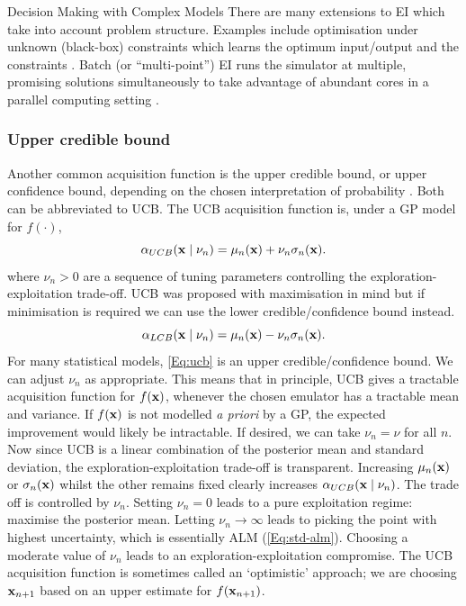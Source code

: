 \begin{chapter}{Decision Making with Complex Models \label{Chap:optimisation}}
There are many extensions to EI which take into account problem structure. Examples include optimisation under unknown (black-box) constraints which learns the optimum input/output and the constraints \citep{Gramacy2010}. Batch (or ``multi-point'') EI runs the simulator at multiple, promising solutions simultaneously to take advantage of abundant cores in a parallel computing setting \citep{Marmin2015, Diessner2022}.
\subsubsection{Upper credible bound}
Another common acquisition function is the upper credible bound, or upper confidence bound, depending on the chosen interpretation of probability \citep{Srinivas2009}. Both can be abbreviated to UCB.
The UCB acquisition function is, under a GP model for $f(\cdot)$,
\begin{equation}
 \alpha_{UCB}(\mathbf{x} \mid \nu_n) = \mu_n(\mathbf{x}) + \nu_n \sigma_n(\mathbf{x}). \label{Eq:ucb}
\end{equation}
where $\nu_n > 0$ are a sequence of tuning parameters controlling the exploration-exploitation trade-off. UCB was proposed with maximisation in mind but if minimisation is required we can use the lower credible/confidence bound instead.
\begin{equation}
 \alpha_{LCB}(\mathbf{x} \mid \nu_n) = \mu_n(\mathbf{x}) - \nu_n \sigma_n(\mathbf{x}).
\end{equation}
For many statistical models, \cref{Eq:ucb} is an upper credible/confidence bound. We can adjust $\nu_n$ as appropriate. This means that in principle, UCB gives a tractable acquisition function for $f(\mathbf{x})$, whenever the chosen emulator has a tractable mean and variance. If $f(\mathbf{x})$ is not modelled \textit{a priori} by a GP, the expected improvement would likely be intractable.
 If desired, we can take $\nu_n = \nu$ for all $n$. Now since UCB is a linear combination of the posterior mean and standard deviation, the exploration-exploitation trade-off is transparent. Increasing $\mu_n(\mathbf{x})$ or $\sigma_n(\mathbf{x})$ whilst the other remains fixed clearly increases $\alpha_{UCB}(\mathbf{x} \mid \nu_n)$. The trade off is controlled by $\nu_n$. Setting $\nu_n = 0$ leads to a pure exploitation regime: maximise the posterior mean. Letting $\nu_n \to \infty$ leads to picking the point with highest uncertainty, which is essentially ALM (\cref{Eq:std-alm}). Choosing a moderate value of $\nu_n$ leads to an exploration-exploitation compromise. The UCB acquisition function is sometimes called an `optimistic' approach; we are choosing $\mathbf{x}_{n+1}$ based on an upper estimate for $f(\mathbf{x}_{n+1})$.


\end{chapter}
